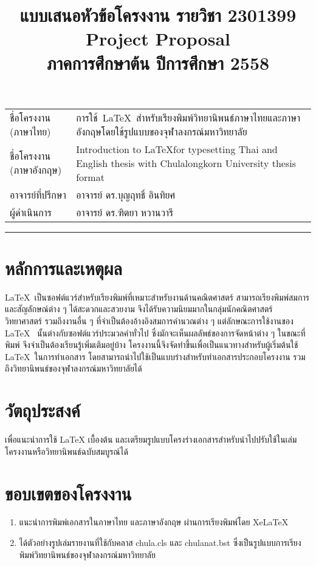 \documentclass[tikz]{standalone}
\begin{document}
\title{แบบเสนอหัวข้อโครงงาน รายวิชา 2301399 \\ Project Proposal \\ ภาคการศึกษาต้น ปีการศึกษา 2558}

\makeatletter
\begin{center}
    {\Large \@title \par}
\end{center}
\makeatother

\begin{tabular}{p{4.5cm}p{9cm}}
ชื่อโครงงาน (ภาษาไทย) & การใช้~\LaTeX ~สำหรับเรียงพิมพ์วิทยานิพนธ์ภาษาไทยและภาษาอังกฤษโดยใช้รูปแบบของจุฬาลงกรณ์มหาวิทยาลัย \\
ชื่อโครงงาน (ภาษาอังกฤษ)	& Introduction to \LaTeX for typesetting Thai and English thesis with Chulalongkorn University thesis format \\
อาจารย์ที่ปรึกษา & อาจารย์ ดร.บุญฤทธิ์ อินทิยศ \\
ผู้ดำเนินการ	& อาจารย์ ดร.ฑิตยา หวานวารี \\
\end{tabular}
    \vspace*{0.4cm}
    \hrule width 15 cm height 0.0 cm depth 0.025 cm

\section{หลักการและเหตุผล}
\LaTeX~เป็นซอฟต์แวร์สำหรับเรียงพิมพ์ที่เหมาะสำหรับงานด้านคณิตศาสตร์ สามารถเรียงพิมพ์สมการและสัญลักษณ์ต่าง ๆ ได้สะดวกและสวยงาม จึงได้รับความนิยมมากในกลุ่มนักคณิตศาสตร์ วิทยาศาสตร์ รวมถึงงานอื่น ๆ ที่จำเป็นต้องอ้างอิงสมการคำนวณต่าง ๆ แต่ลักษณะการใช้งานของ \LaTeX~ นั้นต่างกับซอฟต์แวร์ประมวลคำทั่วไป ซึ่งมักจะเห็นผลลัพธ์ของการจัดหน้าต่าง ๆ ในขณะที่พิมพ์ จึงจำเป็นต้องเรียนรู้เพิ่มเติมอยู่บ้าง โครงงานนี้จึงจัดทำขึ้นเพื่อเป็นแนวทางสำหรับผู้เริ่มต้นใช้ \LaTeX~ในการทำเอกสาร โดยสามารถนำไปใช้เป็นแบบร่างสำหรับทำเอกสารประกอบโครงงาน รวมถึงวิทยานิพนธ์ของจุฬาลงกรณ์มหาวิทยาลัยได้
\section{วัตถุประสงค์}
เพื่อแนะนำการใช้ {\normalfont \LaTeX} เบื้องต้น และเตรียมรูปแบบโครงร่างเอกสารสำหรับนำไปปรับใช้ในเล่มโครงงานหรือวิทยานิพนธ์ฉบับสมบูรณ์ได้
\section{ขอบเขตของโครงงาน}
\begin{enumerate}
    \item แนะนำการพิมพ์เอกสารในภาษาไทย และภาษาอังกฤษ ผ่านการเรียงพิมพ์โดย {\normalfont Xe\LaTeX}
    \item ได้ตัวอย่างรูปเล่มรายงานที่ใช้กับคลาส chula.cls และ chulanat.bst ซึ่งเป็นรูปแบบการเรียงพิมพ์วิทยานิพนธ์ของจุฬาลงกรณ์มหาวิทยาลัย
\end{enumerate}
\end{document}
